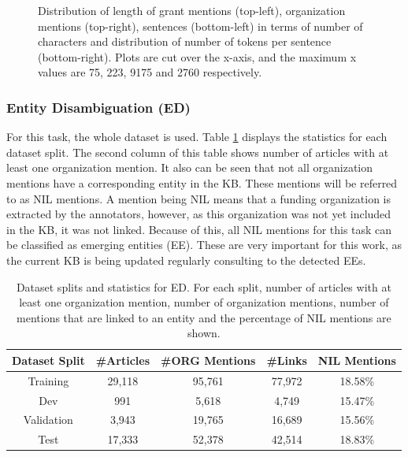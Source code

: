 \documentclass{report}
\theoremstyle{definition}
\theoremstyle{remark}
\begin{document}
\begin{figure}
    \caption{Distribution of length of grant mentions (top-left), organization mentions (top-right), sentences (bottom-left) in terms of number of characters and distribution of number of tokens per sentence (bottom-right). Plots are cut over the x-axis, and the maximum x values are 75, 223, 9175 and 2760 respectively.}
    \label{fig:nerdatalen}
\end{figure}

\subsubsection{Entity Disambiguation (ED)}
For this task, the whole dataset is used. Table \ref{tab:goldstatsed} displays the statistics for each dataset split. The second column of this table shows number of articles with at least one organization mention. It also can be seen that not all organization mentions have a corresponding entity in the KB. These mentions will be referred to as NIL mentions. A mention being NIL means that a funding organization is extracted by the annotators, however, as this organization was not yet included in the KB, it was not linked. Because of this, all NIL mentions for this task can be classified as emerging entities (EE). These are very important for this work, as the current KB is being updated regularly consulting to the detected EEs.

\begin{table}[h!]
    \centering
    \begin{tabular}{ccccc}
    Dataset Split & \#Articles & \#ORG Mentions & \#Links & NIL Mentions  \\
    \hline
    Training & 29,118 & 95,761 & 77,972 & 18.58\% \\
    Dev & 991 & 5,618 & 4,749 & 15.47\% \\
    Validation & 3,943 & 19,765 & 16,689 & 15.56\% \\
    Test & 17,333 & 52,378 & 42,514 & 18.83\% \\ 
    \end{tabular}
    \caption{Dataset splits and statistics for ED. For each split, number of articles with at least one organization mention, number of organization mentions, number of mentions that are linked to an entity and the percentage of NIL mentions are shown.}
    \label{tab:goldstatsed}
\end{table}
\end{document}
